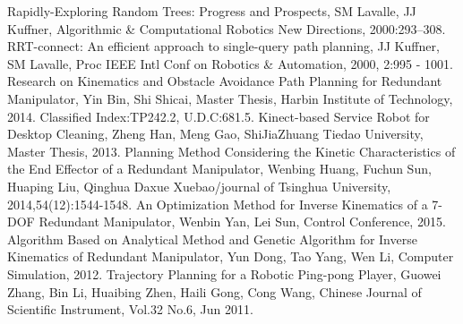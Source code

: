 \documentclass[letterpaper, 10 pt, conference]{ieeeconf}  %
\begin{document}
\begin{thebibliography}{99}

 Rapidly-Exploring Random Trees: Progress and Prospects, SM Lavalle, JJ Kuffner, Algorithmic \& Computational Robotics New Directions, 2000:293--308.
 RRT-connect: An efficient approach to single-query path planning, JJ Kuffner, SM Lavalle, Proc IEEE Intl Conf on Robotics \& Automation, 2000, 2:995 - 1001.
 Research on Kinematics and Obstacle Avoidance Path Planning for Redundant Manipulator, Yin Bin, Shi Shicai, Master Thesis, Harbin Institute of Technology, 2014. Classified Index:TP242.2, U.D.C:681.5.	
 Kinect-based Service Robot for Desktop Cleaning, Zheng Han, Meng Gao, ShiJiaZhuang Tiedao University, Master Thesis, 2013.
 Planning Method Considering the Kinetic Characteristics of the End Effector of a Redundant Manipulator, Wenbing Huang, Fuchun Sun, Huaping Liu, Qinghua Daxue Xuebao/journal of Tsinghua University, 2014,54(12):1544-1548.
 An Optimization Method for Inverse Kinematics of a 7-DOF Redundant Manipulator, Wenbin Yan, Lei Sun, Control Conference, 2015.
 Algorithm Based on Analytical Method and Genetic Algorithm for Inverse Kinematics of Redundant Manipulator, Yun Dong, Tao Yang, Wen Li, Computer Simulation, 2012.
 Trajectory Planning for a Robotic Ping-pong Player, Guowei Zhang, Bin Li, Huaibing Zhen, Haili Gong, Cong Wang, Chinese Journal of Scientific Instrument, Vol.32 No.6, Jun 2011.

\end{thebibliography}
\end{document}
